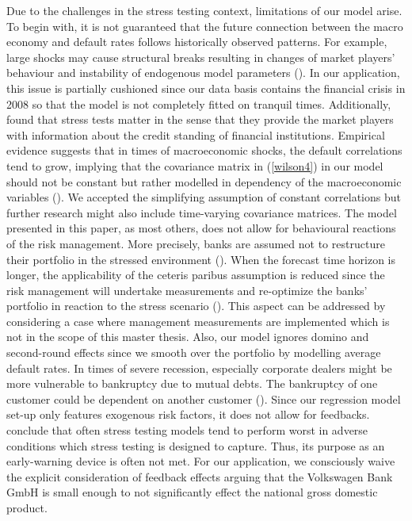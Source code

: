 \documentclass[a4paper, 12pt]{scrreprt}
\begin{document}
Due to the challenges in the stress testing context, limitations of our model arise.
To begin with, it is not guaranteed that the future connection between the macro economy and default rates follows historically observed patterns. For example, large shocks may cause structural breaks resulting in changes of market players' behaviour and instability of endogenous model parameters (\textcite[p. 21]{bis2004sorge}). In our application, this issue is partially cushioned since our data basis contains the financial crisis in 2008 so that the model is not completely fitted on tranquil times. Additionally, \textcite{gross2017dostresstestsmatter} found that stress tests matter in the sense that they provide the market players with information about the credit standing of financial institutions.
Empirical evidence suggests that in times of macroeconomic shocks, the default correlations tend to grow, implying that the covariance matrix in (\ref{wilson4}) in our model should not be constant but rather modelled in dependency of the macroeconomic variables (\textcite[p. 25]{bis2004sorge}). We accepted the simplifying assumption of constant correlations but further research might also include time-varying covariance matrices.
The model presented in this paper, as most others, does not allow for behavioural reactions of the risk management. More precisely, banks are assumed not to restructure their portfolio in the stressed environment (\textcite[p. 5]{borio2014stress}).
When the forecast time horizon is longer, the applicability of the ceteris paribus assumption is reduced since the risk management will undertake measurements and re-optimize the banks' portfolio in reaction to the stress scenario (\textcite[p. 16]{bis2004sorge}).
This aspect can be addressed by considering a case where management measurements are implemented which is not in the scope of this master thesis.
Also, our model ignores domino and second-round effects since we smooth over the portfolio by modelling average default rates. In times of severe recession, especially corporate dealers might be more vulnerable to bankruptcy due to mutual debts. The bankruptcy of one customer could be dependent on another customer (\textcite[p. 7]{bis2004sorge}).
Since our regression model set-up only features exogenous risk factors, it does not allow for feedbacks.
\textcite[p. 7]{borio2014stress} conclude that often stress testing models tend to perform worst in adverse conditions which stress testing is designed to capture. Thus, its purpose as an early-warning device is often not met. For our application, we consciously waive the explicit consideration of feedback effects arguing that the Volkswagen Bank GmbH is small enough to not significantly effect the national gross domestic product.
\end{document}
